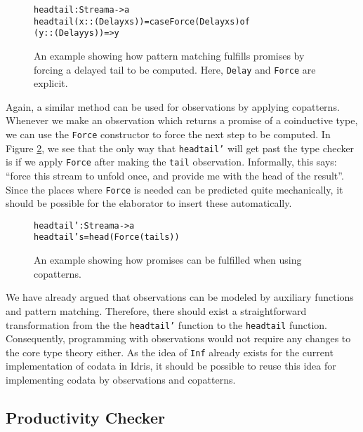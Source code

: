 \begin{figure}
\begin{alltt}
headtail : Stream a -> a
headtail (x :: (Delay xs)) = case Force (Delay xs) of
                               (y :: (Delay ys)) => y
\end{alltt}
\caption{An example showing how pattern matching fulfills promises by forcing a delayed tail to be computed. Here, \texttt{Delay} and \texttt{Force} are explicit.}
\label{fig:headtail}
\end{figure}

Again, a similar method can be used for observations by applying copatterns. Whenever we make an observation which returns a promise of a coinductive type,
we can use the \texttt{Force} constructor to force the next step to be computed. In Figure \ref{fig:headtail_copatterns}, we see that the only way that \texttt{headtail'} will get past the type checker is if we apply \texttt{Force} after making the \texttt{tail} observation. Informally, this says: ``force this stream to unfold once, and provide me with the head of the result''. Since the places where \texttt{Force} is needed can be predicted quite mechanically, it should be possible for the elaborator to insert these automatically.

\begin{figure}
\begin{alltt}
headtail' : Stream a -> a
headtail' s = head (Force (tail s))
\end{alltt}
\caption{An example showing how promises can be fulfilled when using copatterns.}
\label{fig:headtail_copatterns}
\end{figure}

We have already argued that observations can be modeled by auxiliary functions and pattern matching. Therefore, there should exist a straightforward transformation from the the \texttt{headtail'} function to the \texttt{headtail} function. Consequently, programming with observations would not require any changes to the core type theory either. As the idea of \texttt{Inf} already exists for the current implementation of codata in Idris, it should be possible to reuse this idea for implementing codata by observations and copatterns.

\subsection{Productivity Checker}
\label{sec:copattern_in_idris_productivity_checker}

